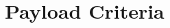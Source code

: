 \documentclass[class=article, crop=false]{standalone}
\begin{document}
	\section{Payload Criteria}
	
		
		\pagebreak
		
		
		\pagebreak
		
\end{document}
